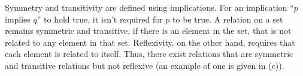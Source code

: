 Symmetry and transitivity are defined using implications.
For an implication ``$p$ implies $q$'' to hold true, it isn’t required for $p$ to be true.
A relation on a set remains symmetric and transitive, if there is an element in the set, that is not related to any element in that set.
Reflexivity, on the other hand, requires that each element is related to itself.
Thus, there exist relations that are symmetric and transitive relations but not reflexive (an example of one is given in (c)).
